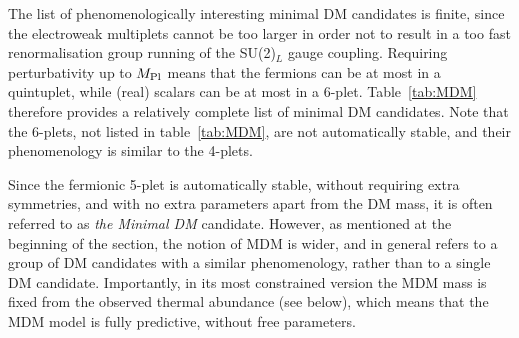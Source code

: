 The list of phenomenologically interesting minimal DM candidates is finite, since the electroweak multiplets cannot be too larger 
in order not to result in a too fast renormalisation group running of the SU(2)$_L$ gauge coupling.  Requiring perturbativity up to $M_{\rm Pl}$ means that the fermions can be at most in a quintuplet, while (real) scalars can be at most in a 6-plet. Table~\ref{tab:MDM} therefore provides a relatively complete list of minimal DM candidates. Note that the 
6-plets, not listed in table~\ref{tab:MDM}, are not automatically stable, and their phenomenology is similar to the 4-plets. 

\medskip

Since the fermionic 5-plet is automatically stable, without requiring extra symmetries, 
and with no extra parameters apart from the DM mass, it is often referred to as {\em the Minimal DM} candidate.
 However, as mentioned at the beginning of the section, the notion of MDM is wider, and in general refers to
 a group of DM candidates with a similar phenomenology, 
 rather than to a single DM  candidate.
Importantly, in its most constrained version the MDM mass is fixed from the observed thermal abundance (see below), 
which means that the MDM model is fully predictive, without free parameters.

\bigskip

